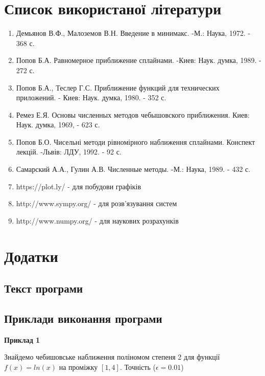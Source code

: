 \documentclass[ukrainian,14pt]{extarticle}
\begin{document}
\newpage

\section*{Список використаної літератури}

\begin{enumerate}
\item  Демьянов В.Ф., Малоземов В.Н. Введение в минимакс. -М.: Наука, 1972. - 368 с.
\item Попов Б.А. Равномерное приближение сплайнами. -Киев: Наук. думка, 1989. - 272 с.
\item Попов Б.А., Теслер Г.С. Приближение функций для технических приложений. - Киев: Наук. думка, 1980. - 352 с.
\item Ремез Е.Я. Основы численных методов чебышовского приближения. Киев: Наук. думка, 1969, - 623 с.
\item Попов Б.О. Чисельні методи рівномірного наближення сплайнами. Конспект лекцій. -Львів: ЛДУ, 1992. - 92 с.
\item Самарский А.А., Гулин А.В. Численные методы. -М.: Наука, 1989. - 432 с.
\item https://plot.ly/ - для побудови графіків
\item http://www.sympy.org/ - для розв'язування систем
\item http://www.numpy.org/ - для наукових розрахунків
\end{enumerate}

\newpage

\section{Додатки}

\subsection{Текст програми}


\newpage

\subsection{Приклади виконання програми}
\textbf{Приклад 1} 	

Знайдемо чебишовське наближення поліномом степеня 2 для функції $f(x) = ln(x)$ на проміжку $[1, 4]$. Точність ($\epsilon = 0.01$)
\end{document}
